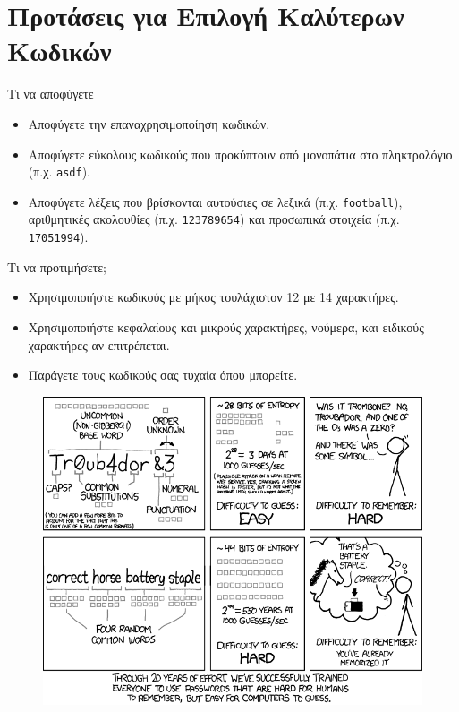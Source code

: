 \documentclass[10pt]{beamer}
\begin{document}
\section{Προτάσεις για Επιλογή Καλύτερων Κωδικών}
\begin{frame}{Τι να αποφύγετε}
    \begin{itemize}
        \item Αποφύγετε την επαναχρησιμοποίηση κωδικών.
        \item Αποφύγετε εύκολους κωδικούς που προκύπτουν από μονοπάτια στο πληκτρολόγιο (π.χ. \texttt{asdf}).
        \item Αποφύγετε λέξεις που βρίσκονται αυτούσιες σε λεξικά (π.χ. \texttt{football}), αριθμητικές ακολουθίες (π.χ. \texttt{123789654}) και προσωπικά στοιχεία (π.χ. \texttt{17051994}).
    \end{itemize}
\end{frame}

\begin{frame}{Τι να προτιμήσετε;}
    \begin{itemize}
        \item Χρησιμοποιήστε κωδικούς με μήκος τουλάχιστον 12 με 14 χαρακτήρες.
        \item Χρησιμοποιήστε κεφαλαίους και μικρούς χαρακτήρες, νούμερα, και ειδικούς χαρακτήρες αν επιτρέπεται.
        \item Παράγετε τους κωδικούς σας τυχαία όπου μπορείτε.
    \end{itemize}
\end{frame}

\begin{frame}
    \begin{figure}
        \centering
        \includegraphics[width=\textwidth]{password_strength}
    \end{figure}
\end{frame}
\end{document}
